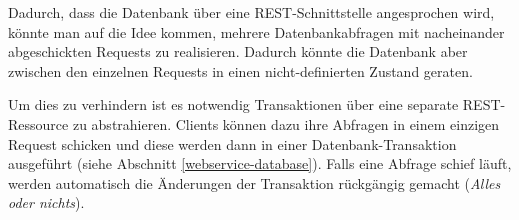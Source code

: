 Dadurch, dass die Datenbank über eine \gls{REST}-Schnittstelle angesprochen wird, könnte man auf die Idee kommen, mehrere Datenbankabfragen mit nacheinander abgeschickten Requests zu realisieren.
Dadurch könnte die Datenbank aber zwischen den einzelnen Requests in einen nicht-definierten Zustand geraten.

Um dies zu verhindern ist es notwendig Transaktionen über eine separate \gls{REST}-Ressource zu abstrahieren.
Clients können dazu ihre Abfragen in einem einzigen Request schicken und diese werden dann in einer Datenbank-Transaktion ausgeführt (siehe Abschnitt \ref{webservice-database}).
Falls eine Abfrage schief läuft, werden automatisch die Änderungen der Transaktion rückgängig gemacht (\emph{Alles oder nichts}).